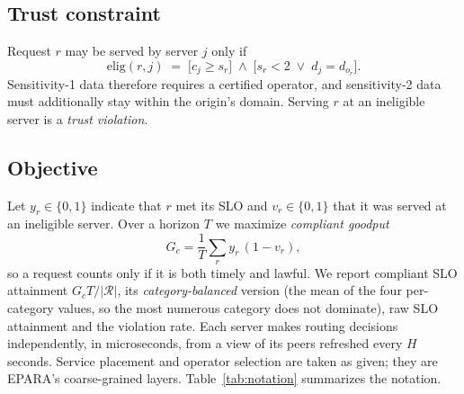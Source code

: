 \documentclass[journal]{IEEEtran}
\begin{document}
\subsection{Trust constraint}
Request $r$ may be served by server $j$ only if
\begin{equation}
\mathrm{elig}(r,j)\;=\;\big[c_j\ge s_r\big]\;\wedge\;\big[s_r<2\;\vee\;d_j=d_{o_r}\big].\label{eq:elig}
\end{equation}
Sensitivity-1 data therefore requires a certified operator, and sensitivity-2 data must additionally stay within the origin's domain. Serving $r$ at an ineligible server is a \emph{trust violation}.

\subsection{Objective}
Let $y_r\in\{0,1\}$ indicate that $r$ met its SLO and $v_r\in\{0,1\}$ that it was served at an ineligible server. Over a horizon $T$ we maximize \emph{compliant goodput}
\begin{equation}
G_c=\frac{1}{T}\sum_{r}y_r\,(1-v_r),\label{eq:obj}
\end{equation}
so a request counts only if it is both timely and lawful. We report compliant SLO attainment $G_cT/|\mathcal{R}|$, its \emph{category-balanced} version (the mean of the four per-category values, so the most numerous category does not dominate), raw SLO attainment and the violation rate. Each server makes routing decisions independently, in microseconds, from a view of its peers refreshed every $H$ seconds. Service placement and operator selection are taken as given; they are EPARA's coarse-grained layers. Table~\ref{tab:notation} summarizes the notation.
\end{document}
